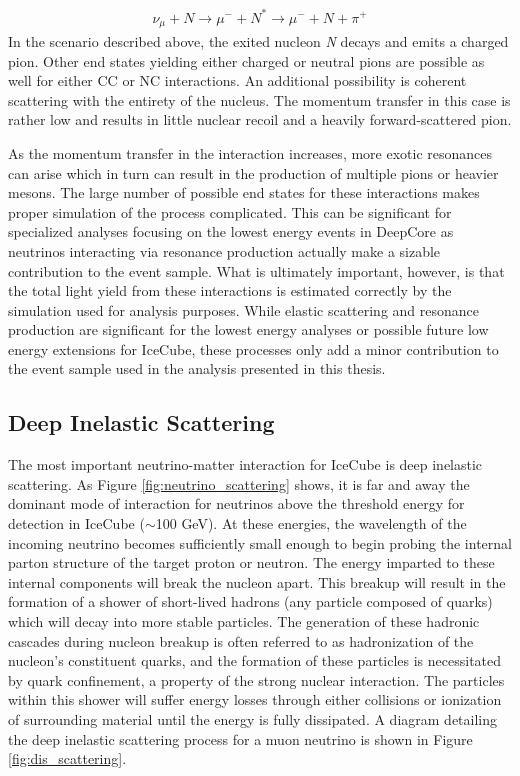 \documentclass{gatech-thesis}
\begin{document}
\begin{eqnarray}
\nu_{\mu} + N \rightarrow \mu^{-} + N^{*} \rightarrow \mu^{-} + N + \pi^{+}
\end{eqnarray}
In the scenario described above, the exited nucleon \textit{N} decays and emits a charged pion. Other end states yielding either charged or neutral pions are possible as well for either CC or NC interactions. An additional possibility is coherent scattering with the entirety of the nucleus. The momentum transfer in this case is rather low and results in little nuclear recoil and a heavily forward-scattered pion.

As the momentum transfer in the interaction increases, more exotic resonances can arise which in turn can result in the production of multiple pions or heavier mesons. The large number of possible end states for these interactions makes proper simulation of the process complicated. This can be significant for specialized analyses focusing on the lowest energy events in DeepCore as neutrinos interacting via resonance production actually make a sizable contribution to the event sample. What is ultimately important, however, is that the total light yield from these interactions is estimated correctly by the simulation used for analysis purposes. While elastic scattering and resonance production are significant for the lowest energy analyses or possible future low energy extensions for IceCube, these processes only add a minor contribution to the event sample used in the analysis presented in this thesis.

\subsection{Deep Inelastic Scattering}
The most important neutrino-matter interaction for IceCube is deep inelastic scattering. As Figure \ref{fig:neutrino_scattering} shows, it is far and away the dominant mode of interaction for neutrinos above the threshold energy for detection in IceCube ($\sim$100 GeV). At these energies, the wavelength of the incoming neutrino becomes sufficiently small enough to begin probing the internal parton structure of the target proton or neutron. The energy imparted to these internal components will break the nucleon apart. This breakup will result in the formation of a shower of short-lived hadrons (any particle composed of quarks) which will decay into more stable particles. The generation of these hadronic cascades during nucleon breakup is often referred to as hadronization of the nucleon's constituent quarks, and the formation of these particles is necessitated by quark confinement, a property of the strong nuclear interaction. The particles within this shower will suffer energy losses through either collisions or ionization of surrounding material until the energy is fully dissipated. A diagram detailing the deep inelastic scattering process for a muon neutrino is shown in Figure \ref{fig:dis_scattering}.
\end{document}
